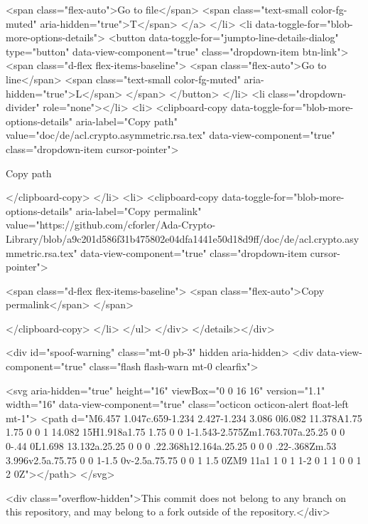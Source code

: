             <span class="flex-auto">Go to file</span>
            <span class="text-small color-fg-muted" aria-hidden="true">T</span>
</a>        </li>
        <li data-toggle-for="blob-more-options-details">
            <button data-toggle-for="jumpto-line-details-dialog" type="button" data-view-component="true" class="dropdown-item btn-link">    <span class="d-flex flex-items-baseline">
              <span class="flex-auto">Go to line</span>
              <span class="text-small color-fg-muted" aria-hidden="true">L</span>
            </span>
</button>        </li>
        <li class="dropdown-divider" role="none"></li>
        <li>
          <clipboard-copy data-toggle-for="blob-more-options-details" aria-label="Copy path" value="doc/de/acl.crypto.asymmetric.rsa.tex" data-view-component="true" class="dropdown-item cursor-pointer">
    
            Copy path

</clipboard-copy>        </li>
        <li>
          <clipboard-copy data-toggle-for="blob-more-options-details" aria-label="Copy permalink" value="https://github.com/cforler/Ada-Crypto-Library/blob/a9c201d586f31b475802e04dfa1441e50d18d9ff/doc/de/acl.crypto.asymmetric.rsa.tex" data-view-component="true" class="dropdown-item cursor-pointer">
    
            <span class="d-flex flex-items-baseline">
              <span class="flex-auto">Copy permalink</span>
            </span>

</clipboard-copy>        </li>
      </ul>
</div>
</details></div>





    <div id="spoof-warning" class="mt-0 pb-3" hidden aria-hidden>
  <div data-view-component="true" class="flash flash-warn mt-0 clearfix">
  
    <svg aria-hidden="true" height="16" viewBox="0 0 16 16" version="1.1" width="16" data-view-component="true" class="octicon octicon-alert float-left mt-1">
    <path d="M6.457 1.047c.659-1.234 2.427-1.234 3.086 0l6.082 11.378A1.75 1.75 0 0 1 14.082 15H1.918a1.75 1.75 0 0 1-1.543-2.575Zm1.763.707a.25.25 0 0 0-.44 0L1.698 13.132a.25.25 0 0 0 .22.368h12.164a.25.25 0 0 0 .22-.368Zm.53 3.996v2.5a.75.75 0 0 1-1.5 0v-2.5a.75.75 0 0 1 1.5 0ZM9 11a1 1 0 1 1-2 0 1 1 0 0 1 2 0Z"></path>
</svg>

      <div class="overflow-hidden">This commit does not belong to any branch on this repository, and may belong to a fork outside of the repository.</div>


